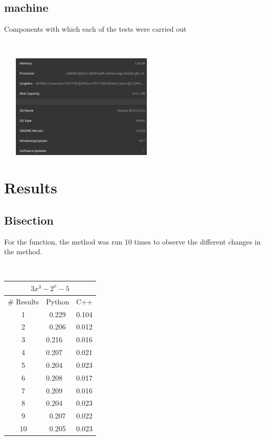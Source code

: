 \documentclass[conference]{IEEEtran}
\begin{document}
\subsection{machine}

Components with which each of the tests were carried out

\


\includegraphics[width=8cm, height= 5cm]{specs2.PNG}







\section{Results}

\subsection{Bisection}

For the function, the method was run 10 times to observe the different changes in the method.

\


\begin{tabular}{|c|l|l}
\hline
\multicolumn{3}{|c|}{\(3x^3 - 2^x - 5\)}     \\ \hline
\# Results & \multicolumn{1}{c|}{Python} & \multicolumn{1}{c|}{C++}   \\ \hline
1          & \multicolumn{1}{c|}{0.229}  & \multicolumn{1}{c|}{0.104} \\ \hline
2          & \multicolumn{1}{c|}{0.206}  & \multicolumn{1}{c|}{0.012} \\ \hline
3          & 0.216                       & \multicolumn{1}{l|}{0.016} \\ \hline
4          & 0.207                       & \multicolumn{1}{l|}{0.021} \\ \hline
5          & 0.204                       & \multicolumn{1}{l|}{0.023} \\ \hline
6          & 0.208                       & \multicolumn{1}{l|}{0.017} \\ \hline
7          & 0.209                       & \multicolumn{1}{l|}{0.016} \\ \hline
8          & 0.204                       & \multicolumn{1}{l|}{0.023} \\ \hline
9          & \multicolumn{1}{c|}{0.207}  & \multicolumn{1}{c|}{0.022} \\ \hline
10         & \multicolumn{1}{c|}{0.205}  & \multicolumn{1}{c|}{0.023}  \\ \hline
\end{tabular}
\end{document}
